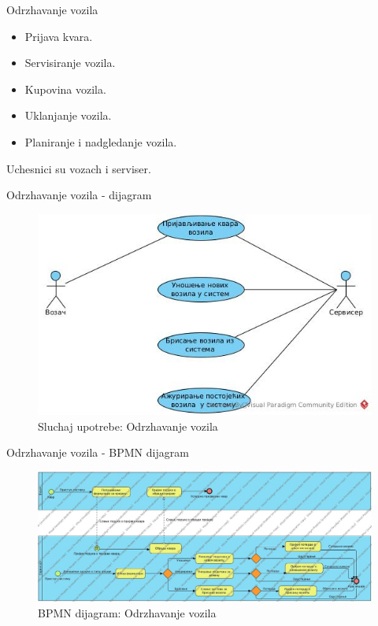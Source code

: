\documentclass[11pt]{beamer}
\begin{document}
\begin{frame}{Odrzhavanje vozila}
    \begin{itemize}
        \item Prijava kvara.
        \item Servisiranje vozila.
        \item Kupovina vozila.
        \item Uklanjanje vozila.
        \item Planiranje i nadgledanje vozila. 
    \end{itemize}
    Uchesnici su vozach i serviser.
\end{frame}
\begin{frame}{Odrzhavanje vozila - dijagram}
    \begin{figure}
        \centering
        \includegraphics[scale=0.6]{Slike/UML/SUodrzavanje.jpg}
        \caption{Sluchaj upotrebe: Odrzhavanje vozila}
        \label{fig:ov}
    \end{figure}    
\end{frame}
\begin{frame}{Odrzhavanje vozila - BPMN dijagram}
    \begin{figure}
        \centering
        \includegraphics[scale=0.25]{Slike/BPMN/BPMNodrzavanje.jpg}
        \caption{BPMN dijagram: Odrzhavanje vozila}
        \label{fig:bpmnov}
    \end{figure}    
\end{frame}
\end{document}
